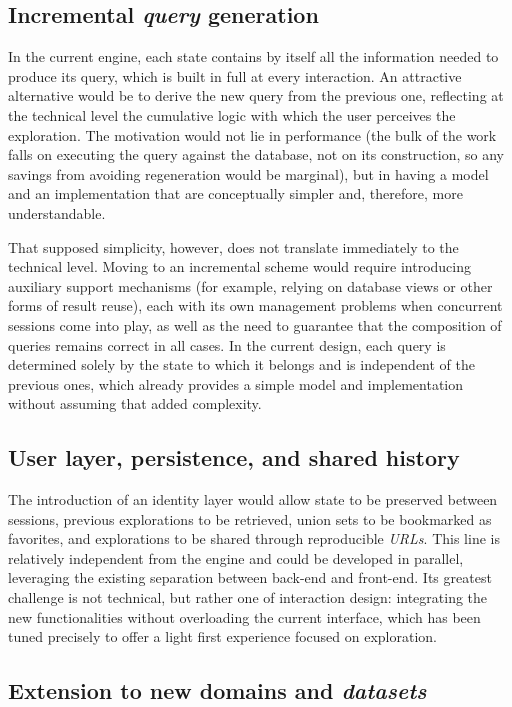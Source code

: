 \subsection*{Incremental \textit{query} generation}

In the current engine, each state contains by itself all the information needed to produce its
query, which is built in full at every interaction. An attractive alternative would be to
derive the new query from the previous one, reflecting at the technical level the cumulative
logic with which the user perceives the exploration. The motivation would not lie in
performance (the bulk of the work falls on executing the query against the database, not on its
construction, so any savings from avoiding regeneration would be marginal), but in having a
model and an implementation that are conceptually simpler and, therefore, more understandable.

That supposed simplicity, however, does not translate immediately to the technical level.
Moving to an incremental scheme would require introducing auxiliary support mechanisms (for
example, relying on database views or other forms of result reuse), each with its own
management problems when concurrent sessions come into play, as well as the need to guarantee
that the composition of queries remains correct in all cases. In the current design, each
query is determined solely by the state to which it belongs and is independent of the previous
ones, which already provides a simple model and implementation without assuming that added
complexity.

\subsection*{User layer, persistence, and shared history}

The introduction of an identity layer would allow state to be preserved between sessions,
previous explorations to be retrieved, union sets to be bookmarked as favorites, and
explorations to be shared through reproducible \textit{URLs}. This line is relatively
independent from the engine and could be developed in parallel, leveraging the existing
separation between back-end and front-end. Its greatest challenge is not technical, but rather
one of interaction design: integrating the new functionalities without overloading the current
interface, which has been tuned precisely to offer a light first experience focused on
exploration.

\subsection*{Extension to new domains and \textit{datasets}}

